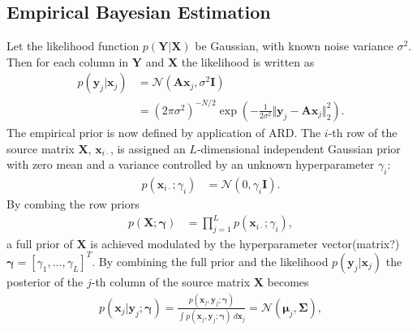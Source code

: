 \subsection{Empirical Bayesian Estimation}
Let the likelihood function $p(\mathbf{Y} \vert \mathbf{X})$ be Gaussian, with known noise variance $\sigma^2$. 
Then for each column in $\mathbf{Y}$ and $\mathbf{X}$ the likelihood is written as
\begin{align*}
p(\mathbf{y}_{j} \vert \mathbf{x}_{j}) &= \mathcal{N}(\mathbf{Ax}_{j}, \sigma^2 \mathbf{I}) \\
&= (2 \pi \sigma^2)^{-N/2} \exp \left( - \frac{1}{2 \sigma^2} \Vert \mathbf{y}_{j} - \mathbf{A} \mathbf{x}_{j} \Vert_2^2 \right).
\end{align*}
The empirical prior is now defined by application of ARD. 
The $i$-th row of the source matrix $\mathbf{X}$, $\mathbf{x}_{i \cdot}$, is assigned an $L$-dimensional independent Gaussian prior with zero mean and a variance controlled by an unknown hyperparameter $\gamma_i$:
\begin{align*}
p (\mathbf{x}_{i \cdot} ; \gamma_i) &= \mathcal{N}(0, \gamma_i \mathbf{I}).
\end{align*}
By combing the row priors
\begin{align*}
p (\mathbf{X} ; \boldsymbol{\gamma}) &= \prod_{j=1}^L p (\mathbf{x}_{i \cdot} ; \gamma_i),
\end{align*}
a full prior of $\mathbf{X}$ is achieved modulated by the hyperparameter vector(matrix?) $\boldsymbol{\gamma} = [\gamma_1, \dots, \gamma_L]^T$. 
By combining the full prior and the likelihood $p(\mathbf{y}_{j} \vert \mathbf{x}_{j})$ the posterior of the $j$-th column of the source matrix $\mathbf{X}$ becomes
\begin{align*}
p(\mathbf{x}_{j} \vert \mathbf{y}_{j} ; \boldsymbol{\gamma}) = \frac{p(\mathbf{x}_{j}, \mathbf{y}_{j} ; \boldsymbol{\gamma})}{\int p(\mathbf{x}_{j}, \mathbf{y}_{j} ; \boldsymbol{\gamma}) \ d \mathbf{x}_{j}} = \mathcal{N}(\boldsymbol{\mu}_{j}, \boldsymbol{\Sigma}),
\end{align*}
